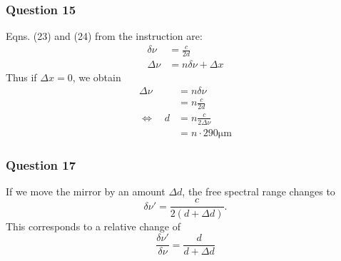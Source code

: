 \subsubsection{Question 15}
Eqns. (23) and (24) from the instruction are:
\begin{align}
	\delta\nu&=\frac{c}{2d}\\
	\Delta \nu&= n\delta\nu +\Delta x
\end{align}
Thus if $\Delta x=0$, we obtain 
\begin{align}
	\Delta \nu &=n \delta \nu \nonumber\\&= n \frac{c}{2d} \\
	\Leftrightarrow \quad d &= n \frac{c}{2\Delta \nu} \\ 
	&= n \cdot 290 \si{\micro\metre}
\end{align}

\subsubsection{Question 17}
If we move the mirror by an amount $\Delta d$, the free spectral range changes to
\begin{equation}
	\delta\nu'=\frac{c}{2(d+\Delta d)}.
\end{equation}
This corresponds to a relative change of
\begin{equation}
	\frac{\delta \nu'}{\delta\nu}=\frac{d}{d+\Delta d}
\end{equation}